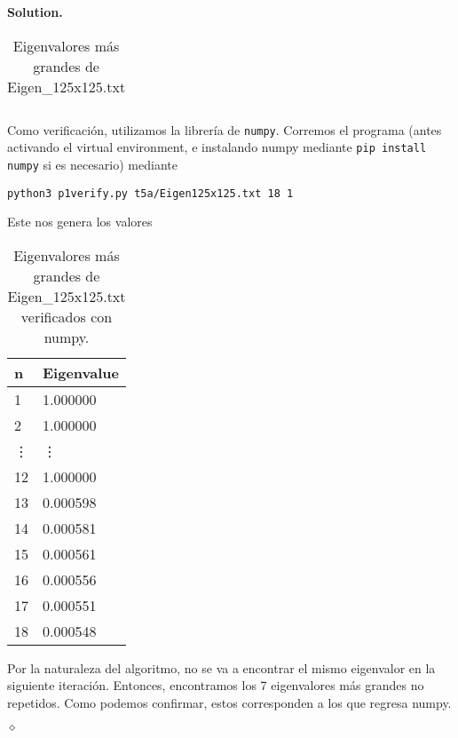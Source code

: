 \documentclass{article}
\theoremstyle{problemstyle}
\newenvironment{solution}{%
  \begin{mdframed}[linewidth=0.8pt,linecolor=Gray,backgroundcolor=Gray!5,roundcorner=5pt]%
  \noindent\textbf{Solution.}%
}{%
\hfill $ \diamond $ 
  \end{mdframed}%
}
\begin{document}
\begin{solution}
\begin{enumerate}
\begin{table}[H]
\begin{center}
\begin{tabular}{|l|l|}
					      \hline
				      \end{tabular}
			      \end{center}
			      \caption{Eigenvalores m\'as grandes de Eigen\_125x125.txt}\label{tab:125x125}
		      \end{table}
		      Como verificaci\'on, utilizamos la librer\'ia de \texttt{numpy}. Corremos el programa (antes activando el virtual environment, e instalando numpy mediante \texttt{pip install numpy} si es necesario) mediante
		      \begin{center}
			      \texttt{python3 p1\textunderscore verify.py t5a/Eigen\textunderscore125x125.txt 18 1}
		      \end{center}
		      Este nos genera los valores
		      \begin{table}[H]
			      \begin{center}
				      \begin{tabular}{|l|l|}
					      \hline
					      n & Eigenvalue \\
					      \hline
					      1 & 1.000000\\
					      \hline
					      2 & 1.000000\\
					      \hline
                \vdots & \vdots\\
					      \hline
					      12 & 1.000000\\
					      \hline
					      13 & 0.000598\\
					      \hline
					      14 & 0.000581\\
					      \hline
					      15 & 0.000561\\
					      \hline
					      16 & 0.000556\\
					      \hline
					      17 & 0.000551\\
					      \hline
					      18 & 0.000548\\
					      \hline
				      \end{tabular}
			      \end{center}
			      \caption{Eigenvalores m\'as grandes de Eigen\_125x125.txt verificados con numpy.}\label{tab:py125x125}
		      \end{table}
          Por la naturaleza del algoritmo, no se va a encontrar el mismo
          eigenvalor en la siguiente iteraci\'on. Entonces, encontramos los 7
          eigenvalores m\'as grandes no repetidos. Como podemos confirmar,
          estos corresponden a los que regresa numpy.
	\end{enumerate}
\end{solution}
\end{document}
